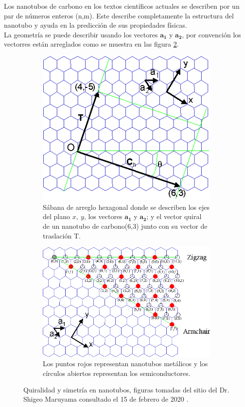 Los nanotubos de carbono en los textos científicos actuales se describen por un par de números enteros (n,m). Este describe completamente la estructura del nanotubo y ayuda en la predicción de sus propiedades físicas.\\

La geometría se puede describir usando los vectores $\mathbf{a_1}$ y $\mathbf{a_2}$, por convención los vectorres están arreglados como se muestra en las figura \ref{fig:CNT}.

\begin{figure}[!h]
\textwidth
\captionsetup[subfigure]{width=0.8\imagewidth,justification=raggedright}
\begin{subfigure}{.5\textwidth}
  \centering
  \includegraphics[width=.6\linewidth]{ChCNT.png}  
  \caption{Sábana de arreglo hexagonal donde se describen los ejes del plano $x,\ y$, los vectores $\mathbf{a_1}$ y $\mathbf{a_2}$; y el vector quiral de un nanotubo de carbono(6,3) junto con su vector de traslación T.}
  \label{fig:ChCNT}
\end{subfigure}
\begin{subfigure}{.5\textwidth}
  \centering
  \includegraphics[width=.75\linewidth]{NT.png}  
  \caption{Los puntos rojos representan nanotubos metálicos y los círculos abiertos representan los semiconductores.}
  \label{fig:CNT}
\end{subfigure}
\caption{Quiralidad y simetría en nanotubos, figuras tomadas del sitio del Dr. Shigeo Maruyama consultado el 15 de febrero de 2020 \cite{ShigeoChiral}.}
\label{fig:GeoVectChir}
\end{figure}

